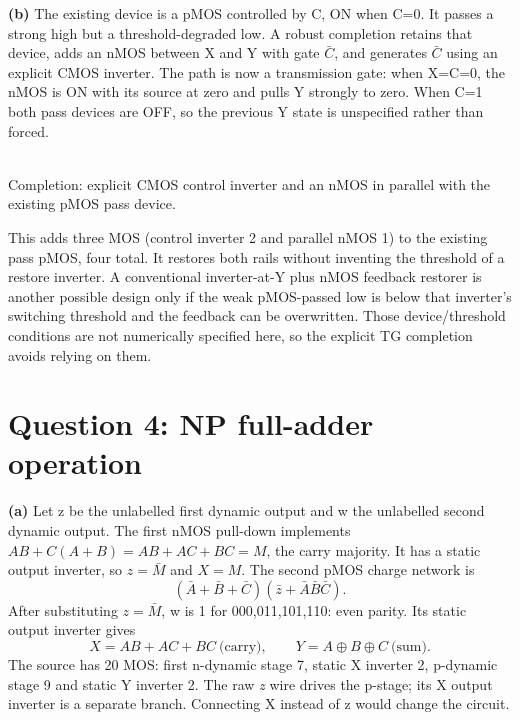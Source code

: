 \documentclass[10pt]{article}
\begin{document}
\textbf{(b)} The existing device is a pMOS controlled by C, ON when C=0. It passes a strong high but a threshold-degraded low. A robust completion retains that device, adds an nMOS between X and Y with gate $\bar C$, and generates $\bar C$ using an explicit CMOS inverter. The path is now a transmission gate: when X=C=0, the nMOS is ON with its source at zero and pulls Y strongly to zero. When C=1 both pass devices are OFF, so the previous Y state is unspecified rather than forced.
\begin{center}\\Completion: explicit CMOS control inverter and an nMOS in parallel with the existing pMOS pass device.\end{center}
This adds three MOS (control inverter 2 and parallel nMOS 1) to the existing pass pMOS, four total. It restores both rails without inventing the threshold of a restore inverter. A conventional inverter-at-Y plus nMOS feedback restorer is another possible design only if the weak pMOS-passed low is below that inverter's switching threshold and the feedback can be overwritten. Those device/threshold conditions are not numerically specified here, so the explicit TG completion avoids relying on them.

\newpage\section*{Question 4: NP full-adder operation}
\textbf{(a)} Let z be the unlabelled first dynamic output and w the unlabelled second dynamic output. The first nMOS pull-down implements $AB+C(A+B)=AB+AC+BC=M$, the carry majority. It has a static output inverter, so $z=\bar M$ and $X=M$. The second pMOS charge network is
\[(\bar A+\bar B+\bar C)(\bar z+\bar A\bar B\bar C).\]
After substituting $z=\bar M$, w is 1 for 000,011,101,110: even parity. Its static output inverter gives
\[\boxed{X=AB+AC+BC\ \text{(carry)},\qquad Y=A\mathbin{\oplus}B\mathbin{\oplus}C\ \text{(sum)}.}\]
The source has 20 MOS: first n-dynamic stage 7, static X inverter 2, p-dynamic stage 9 and static Y inverter 2. The raw \emph{z} wire drives the p-stage; its X output inverter is a separate branch. Connecting X instead of z would change the circuit.
\end{document}
